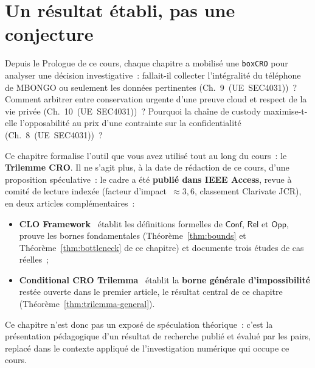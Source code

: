 \bigskip

\section*{Un résultat établi, pas une conjecture}

Depuis le Prologue de ce cours, chaque chapitre a mobilisé une
\texttt{boxCRO} pour analyser une décision investigative~: fallait-il
collecter l'intégralité du téléphone de MBONGO ou seulement les
données pertinentes (Ch.~9~(UE~SEC4031))~? Comment arbitrer entre
conservation urgente d'une preuve cloud et respect de la vie privée
(Ch.~10~(UE~SEC4031))~? Pourquoi la chaîne de custody
maximise-t-elle l'opposabilité au prix d'une contrainte sur la
confidentialité (Ch.~8~(UE~SEC4031))~?

Ce chapitre formalise l'outil que vous avez utilisé tout au long
du cours~: le \textbf{Trilemme CRO}. Il ne s'agit plus, à la date
de rédaction de ce cours, d'une proposition spéculative~: le cadre
a été \textbf{publié dans IEEE Access}, revue à comité de lecture
indexée (facteur d'impact~$\approx 3{,}6$, classement Clarivate
JCR), en deux articles complémentaires~:

\begin{itemize}
    \item \textbf{CLO Framework}~\cite{minka2026clo} établit les
          définitions formelles de $\mathsf{Conf}$, $\mathsf{Rel}$
          et $\mathsf{Opp}$, prouve les bornes fondamentales
          (Théorème~\ref{thm:bounds} et Théorème~\ref{thm:bottleneck}
          de ce chapitre) et documente trois études de cas réelles~;
    \item \textbf{Conditional CRO Trilemma}~\cite{minka2026conditional}
          établit la \textbf{borne générale d'impossibilité} restée
          ouverte dans le premier article, le résultat central de
          ce chapitre (Théorème~\ref{thm:trilemma-general}).
\end{itemize}

Ce chapitre n'est donc pas un exposé de spéculation théorique~:
c'est la présentation pédagogique d'un résultat de recherche
publié et évalué par les pairs, replacé dans le contexte appliqué
de l'investigation numérique qui occupe ce cours.

\separateur

